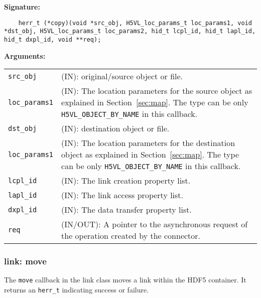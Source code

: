 \begin{mdframed}[style=bgbox]
\textbf{Signature:}
\begin{lstlisting}
    herr_t (*copy)(void *src_obj, H5VL_loc_params_t loc_params1, void *dst_obj, H5VL_loc_params_t loc_params2, hid_t lcpl_id, hid_t lapl_id, hid_t dxpl_id, void **req);
\end{lstlisting}

\textbf{Arguments:}\\
\begin{tabular}{l p{13.5cm}}
  \texttt{src\_obj} & (IN): original/source object or file. \\
  \texttt{loc\_params1} & (IN): The location parameters for the source
  object as explained in Section~\ref{sec:map}. The type can be only \texttt{H5VL\_OBJECT\_BY\_NAME} in this callback. \\
  \texttt{dst\_obj} & (IN): destination object or file. \\
  \texttt{loc\_params1} & (IN): The location parameters for the destination
  object as explained in Section~\ref{sec:map}. The type can be only \texttt{H5VL\_OBJECT\_BY\_NAME} in this callback. \\
  \texttt{lcpl\_id} & (IN): The link creation property list.\\
  \texttt{lapl\_id} & (IN): The link access property list.\\
  \texttt{dxpl\_id} & (IN): The data transfer property list.\\
  \texttt{req} & (IN/OUT): A pointer to the asynchronous request of the
  operation created by the connector.\\
\end{tabular}
\end{mdframed}

\subsubsection{link: move}
The \texttt{move} callback in the link class moves a link within the HDF5 container. It returns an \texttt{herr\_t} indicating success or failure.\bigskip

